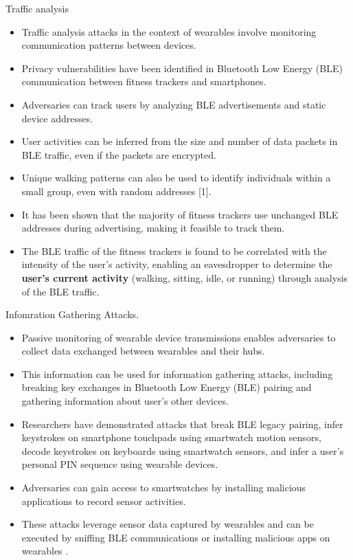 \documentclass[ucs,9pt]{beamer}
\begin{document}
\begin{frame}{Traffic analysis}
	\begin{itemize}
		\item Traffic analysis attacks in the context of wearables involve monitoring communication patterns between devices.
		\item Privacy vulnerabilities have been identified in Bluetooth Low Energy (BLE) communication between fitness trackers and smartphones. 
		\item Adversaries can track users by analyzing BLE advertisements and static device addresses. 
		\item User activities can be inferred from the size and number of data packets in BLE traffic, even if the packets are encrypted. 
		\item Unique walking patterns can also be used to identify individuals within a small group, even with random 	addresses [1].
		\item It has been shown that the majority of fitness 		trackers use unchanged BLE addresses during advertising, 		making it feasible to track them. 
		\item The BLE traffic of the 		fitness trackers is found to be correlated with the intensity 		of the user’s activity, enabling an eavesdropper to determine 		the \textbf{user’s current activity} (walking, sitting, idle, or running) 		through analysis of the BLE traffic. 
	\end{itemize}
\end{frame}

\begin{frame}{Infomration Gathering Attacks.}
	\begin{itemize}
		\item Passive monitoring of wearable device transmissions enables adversaries to collect data exchanged between wearables and their hubs. 
		\item This information can be used for information gathering attacks, including breaking key exchanges in Bluetooth Low Energy (BLE) pairing and gathering information about user's other devices. 
		\item Researchers have demonstrated attacks that break BLE legacy pairing, infer keystrokes on smartphone touchpads using smartwatch motion sensors, decode keystrokes on keyboards using smartwatch sensors, and infer a user's personal PIN sequence using wearable devices.
		\item Adversaries can gain access to smartwatches by installing malicious applications to record sensor activities. 
		\item These attacks leverage sensor data captured by wearables and can be executed by sniffing BLE communications or installing malicious apps on wearables \cite{b1}.
	\end{itemize}
\end{frame}
\end{document}
